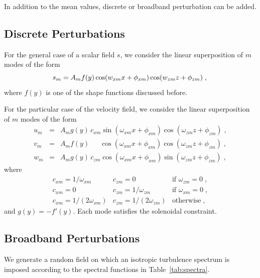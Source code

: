 In addition to the mean values, discrete or broadband perturbation can be added.

\subsection{Discrete Perturbations}

For the general case of a scalar field $s$, we consider the linear superposition of $m$ modes of the form
\begin{equation}
    s_m = A_mf(y) \cos(w_{xm}x+\phi_{xm})\cos(w_{zm}z+\phi_{zm})\;, \\
\end{equation}
where $f(y)$ is one of the shape functions discussed before.

For the particular case of the velocity field, we consider the linear superposition of $m$ modes of the form
\begin{eqnarray}
    u_m &= &A_mg(y)\,c_{xm}         \sin(\omega_{xm}x+\phi_{xm})\cos(\omega_{zm}z+\phi_{zm})\;, \\
    v_m &= &A_mf(y)\phantom{c_{xm}} \cos(\omega_{xm}x+\phi_{xm})\cos(\omega_{zm}z+\phi_{zm})\;, \\
    w_m &= &A_mg(y)\,c_{zm}         \cos(\omega_{xm}x+\phi_{xm})\sin(\omega_{zm}z+\phi_{zm})\;,
\end{eqnarray}
where
\begin{equation*}
    \begin{array}{lll}
        c_{xm}=1/\omega_{xm}    & c_{zm}=0            & \text{if } \omega_{zm}=0\;, \\
        c_{xm}=0           & c_{zm}=1/\omega_{zm}     & \text{if } \omega_{xm}=0\;, \\
        c_{xm}=1/(2\omega_{xm}) & c_{zm}=1/(2\omega_{zm})  & \text{otherwise}\;,
    \end{array}
\end{equation*}
and $g(y)=-f'(y)$. Each mode satisfies the solenoidal constraint.

\subsection{Broadband Perturbations}

We generate a random field on which an isotropic turbulence spectrum  is imposed according to the spectral functions in Table~\ref{tab:spectra}.

